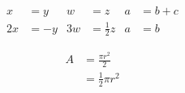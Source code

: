 \documentclass[a4paper]{article}
\begin{document}
\begin{align*}
    x  & =y  & w  & = z           & a & =b+c \\
    2x & =-y & 3w & =\frac{1}{2}z & a & =b
\end{align*}

\begin{equation}
    \begin{split}
        A & = \frac{\pi r^2}{2}   \\
          & = \frac{1}{2} \pi r^2
    \end{split}
\end{equation}
\end{document}
